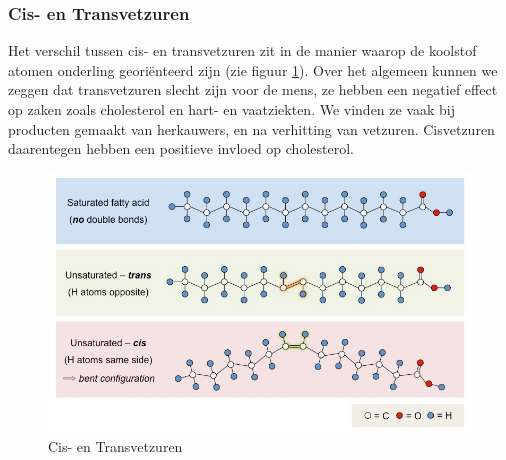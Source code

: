 \documentclass[a4paper,kul]{kulakarticle} %
\begin{document}
\subsubsection{Cis- en Transvetzuren}
Het verschil tussen cis- en transvetzuren zit in de manier waarop de koolstof atomen onderling georiënteerd zijn (zie figuur \ref{fig:cistransvz}). Over het algemeen kunnen we zeggen dat transvetzuren slecht zijn voor de mens, ze hebben een negatief effect op zaken zoals cholesterol en hart- en vaatziekten. We vinden ze vaak bij producten gemaakt van herkauwers, en na verhitting van vetzuren. Cisvetzuren daarentegen hebben een positieve invloed op cholesterol.
\begin{figure}[h]
	\centering
	\includegraphics[width=0.7\linewidth]{CisTransVZ}
	\caption[Cis en Trans]{Cis- en Transvetzuren}
	\label{fig:cistransvz}
\end{figure}
\newpage
\end{document}
